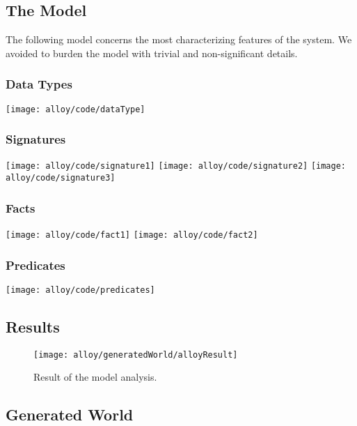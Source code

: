 \subsection{The Model}
	The following model concerns the most characterizing features of the system. We avoided to burden the model with trivial and non-significant details.
	
	\subsubsection*{Data Types}
		\texttt{[image: alloy/code/dataType]}

	\subsubsection*{Signatures}
		\texttt{[image: alloy/code/signature1]}
		\vfill
		\texttt{[image: alloy/code/signature2]}
		\vfill
		\texttt{[image: alloy/code/signature3]}
		\bigskip
	
	\subsubsection*{Facts}
		\texttt{[image: alloy/code/fact1]}
		\vfill
		\texttt{[image: alloy/code/fact2]}
		\bigskip
	
	\subsubsection*{Predicates}
		\texttt{[image: alloy/code/predicates]}
		\bigskip
		
		
\subsection{Results}
	\begin{figure}[H]
		\centering
		\texttt{[image: alloy/generatedWorld/alloyResult]}
		\caption{Result of the model analysis.}		
		\label{fig:alloyResult}
	\end{figure}
	\bigskip
	
	
	
	
\subsection{Generated World}

